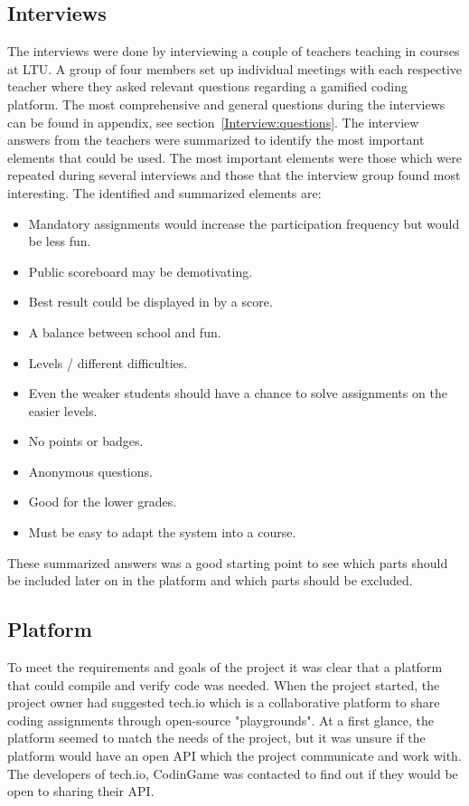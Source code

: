 \documentclass[a4paper,12pt]{article}
\begin{document}
\subsection{Interviews}  
The interviews were done by interviewing a couple of teachers teaching in courses at LTU. A group of four members set up individual meetings with each respective teacher where they asked relevant questions regarding a gamified coding platform. The most comprehensive and general questions during the interviews can be found in appendix, see section~\ref{Interview:questions}. The interview answers from the teachers were summarized to identify the most important elements that could be used. The most important elements were those which were repeated during several interviews and those that the interview group found most interesting. The identified and summarized elements are:

 \begin{itemize}
 \item Mandatory assignments would increase the participation frequency but would be less fun.
 \item Public scoreboard may be demotivating.
 \item Best result could be displayed in by a score.
 \item A balance between school and fun.
 \item Levels / different difficulties. 
 \item Even the weaker students should have a chance to solve assignments on the easier levels.
 \item No points or badges.
 \item Anonymous questions.
 \item Good for the lower grades.
 \item Must be easy to adapt the system into a course.
 \end{itemize}
These summarized answers was a good starting point to see which parts should be included later on in the platform and which parts should be excluded. 

\subsection{Platform}   
To meet the requirements and goals of the project it was clear that a platform that could compile and verify code was needed.
When the project started, the project owner had suggested tech.io which is a collaborative platform to share coding assignments through open-source "playgrounds". At a first glance, the platform seemed to match the needs of the project, but it was unsure if the platform would have an open API which the project communicate and work with. The developers of tech.io, CodinGame was contacted to find out if they would be open to sharing their API.
\end{document}
